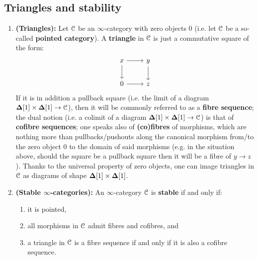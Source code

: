         \subsection{Triangles and stability}
            \begin{definition} \label{def: stable_infinity_categories} 
                
                \begin{enumerate}
                    \item \textbf{(Triangles):} Let $\mathcal{C}$ be an $\infty$-category with zero objects $0$ (i.e. let $\mathcal{C}$ be a so-called \textbf{pointed category}). A \textbf{triangle} in $\mathcal{C}$ is just a commutative square of the form:
                        $$
                            \begin{tikzcd}
                                x & y \\
                                0 & z
                                \arrow[from=1-1, to=2-1]
                                \arrow[from=1-1, to=1-2]
                                \arrow[from=1-2, to=2-2]
                                \arrow[from=2-1, to=2-2]
                            \end{tikzcd}
                        $$
                    If it is in addition a pullback square (i.e. the limit of a diagram $\simp[1] \x \simp[1] \to \C$), then it will be commonly referred to as a \textbf{fibre sequence}; the dual notion (i.e. a colimit of a diagram $\simp[1] \x \simp[1] \to \C$) is that of \textbf{cofibre sequences}; one speaks also of \textbf{(co)fibres} of morphisms, which are nothing more than pullbacks/pushouts along the canonical morphism from/to the zero object $0$ to the domain of said morphisms (e.g. in the situation above, should the square be a pullback square then it will be a fibre of $y \to z$). Thanks to the universal property of zero objects, one can image triangles in $\mathcal{C}$ as diagrams of shape $\simp[1] \x \simp[1]$.
                    \item \textbf{(Stable $\infty$-categories):} An $\infty$-category $\mathcal{C}$ is \textbf{stable} if and only if:
                        \begin{enumerate}
                            \item it is pointed,
                            \item all morphisms in $\mathcal{C}$ admit fibres and cofibres, and
                            \item a triangle in $\mathcal{C}$ is a fibre sequence if and only if it is also a cofibre sequence.
                        \end{enumerate}
                \end{enumerate}
            \end{definition}
